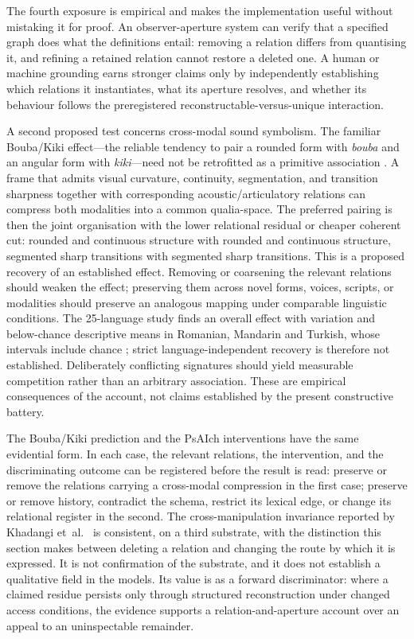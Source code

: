\documentclass[11pt,a4paper]{article}
\theoremstyle{remark}\newtheorem{remark}[definition]{Remark}
\begin{document}
The fourth exposure is empirical and makes the implementation useful without
mistaking it for proof. An observer-aperture system can verify that a specified
graph does what the definitions entail: removing a relation differs from
quantising it, and refining a retained relation cannot restore a deleted one. A
human or machine grounding earns stronger claims only by independently establishing
which relations it instantiates, what its aperture resolves, and whether its
behaviour follows the preregistered reconstructable-versus-unique interaction.

A second proposed test concerns cross-modal sound symbolism. The familiar
Bouba/Kiki effect---the reliable tendency to pair a rounded form with \emph{bouba}
and an angular form with \emph{kiki}---need not be retrofitted as a primitive
association \cite{ramachandranhubbard2001,cwiek2021}. A frame that admits visual curvature,
continuity, segmentation, and transition sharpness together with corresponding
acoustic/articulatory relations can compress both modalities into a common
qualia-space. The preferred pairing is then the joint organisation with the lower
relational residual or cheaper coherent cut: rounded and continuous structure with
rounded and continuous structure, segmented sharp transitions with segmented
sharp transitions. This is a proposed recovery of an established effect. Removing or coarsening the relevant relations should weaken the effect;
preserving them across novel forms, voices, scripts, or modalities should preserve
an analogous mapping under comparable linguistic conditions. The 25-language study finds an overall effect with variation and below-chance descriptive means in Romanian, Mandarin and Turkish, whose intervals include chance \cite{cwiek2021}; strict language-independent recovery is therefore not established. Deliberately conflicting signatures should yield
measurable competition rather than an arbitrary association. These are empirical
consequences of the account, not claims established by the present constructive
battery.

The Bouba/Kiki prediction and the PsAIch interventions have the same evidential
form. In each case, the relevant relations, the intervention, and the
discriminating outcome can be registered before the result is read: preserve or
remove the relations carrying a cross-modal compression in the first case;
preserve or remove history, contradict the schema, restrict its lexical edge, or
change its relational register in the second. The cross-manipulation invariance
reported by Khadangi et~al.\ \cite{khadangi2025} is consistent, on a third
substrate, with the distinction this section makes between deleting a relation and
changing the route by which it is expressed. It is not confirmation of the
substrate, and it does not establish a qualitative field in the models. Its value
is as a forward discriminator: where a claimed residue persists only through
structured reconstruction under changed access conditions, the evidence supports
a relation-and-aperture account over an appeal to an uninspectable remainder.
\end{document}
